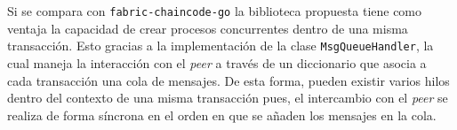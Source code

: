 
%
%
%
%
%

Si se compara con \texttt{fabric-chaincode-go} la biblioteca propuesta tiene como ventaja la capacidad de crear procesos concurrentes dentro de una misma transacción. Esto gracias a la implementación de la clase \texttt{MsgQueueHandler}, la cual maneja la interacción con el \textit{peer} a través de un diccionario que asocia a cada transacción una cola de mensajes. De esta forma, pueden existir varios hilos dentro del contexto de una misma transacción pues, el intercambio con el \textit{peer} se realiza de forma síncrona en el orden en que se añaden los mensajes en la cola.




